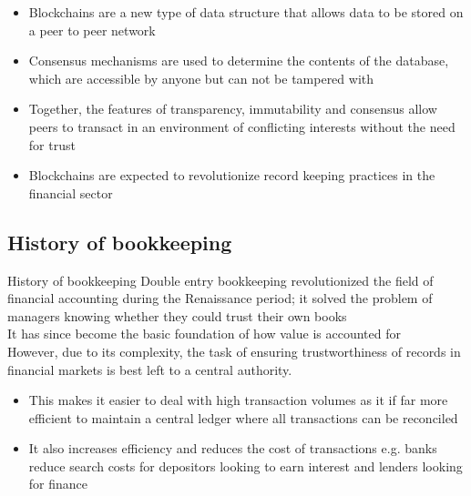 \documentclass[10pt]{beamer}
\begin{document}
\begin{frame}{}
	\begin{itemize}
		\item Blockchains are a new type of data structure that allows data to be stored on a peer to peer network
		\item Consensus mechanisms are used to determine the contents of the database, which are accessible by anyone but can not be tampered with
		\item Together, the features of transparency, immutability and consensus allow peers to transact in an environment of conflicting interests without the need for trust
		\item Blockchains are expected to revolutionize record keeping practices in the financial sector
	\end{itemize}
\end{frame}

\subsection{History of bookkeeping}

\begin{frame}{History of bookkeeping}
	Double entry bookkeeping revolutionized the field of financial accounting during the Renaissance period; it solved the problem of managers knowing whether they could trust their own books \\ \vspace{3mm}
	It has since become the basic foundation of how value is accounted for\\ \vspace{3mm}
	However, due to its complexity, the task of ensuring trustworthiness of records in financial markets is best left to a central authority.
	\begin{itemize}
		\item This makes it easier to deal with high transaction volumes as it if far more efficient to maintain a central ledger where all transactions can be reconciled
		\item It also increases efficiency and reduces the cost of transactions e.g. banks reduce search costs for depositors looking to earn interest and lenders looking for finance
	\end{itemize}
\end{frame}

\end{document}
